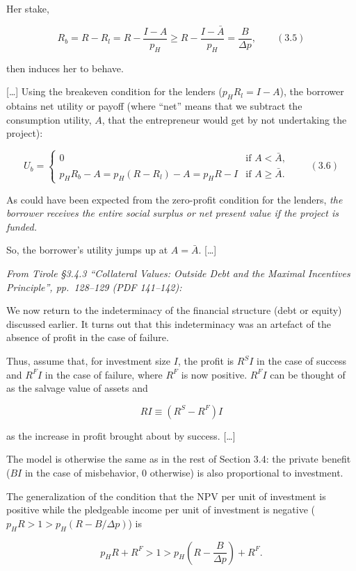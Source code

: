 \documentclass[11pt,a4paper]{article}
\begin{document}
Her stake,

\[R_b = R - R_l = R - \frac{I - A}{p_H} \geqslant R - \frac{I - \bar A}{p_H} = \frac{B}{\Delta p}, \qquad (3.5)\]

then induces her to behave.

{[}\ldots{]} Using the breakeven condition for the lenders (\(p_H R_l = I - A\)), the borrower
obtains net utility or payoff (where ``net'' means that we subtract the consumption utility, \(A\),
that the entrepreneur would get by not undertaking the project):

\[U_b = \begin{cases} 0 & \text{if } A < \bar A, \\ p_H R_b - A = p_H(R - R_l) - A = p_H R - I & \text{if } A \geqslant \bar A. \end{cases} \qquad (3.6)\]

As could have been expected from the zero-profit condition for the lenders, \emph{the borrower
receives the entire social surplus or net present value if the project is funded.}

So, the borrower's utility jumps up at \(A = \bar A\). {[}\ldots{]}

\emph{From Tirole §3.4.3 ``Collateral Values: Outside Debt and the Maximal Incentives Principle'',
pp.~128--129 (PDF 141--142):}

We now return to the indeterminacy of the financial structure (debt or equity) discussed earlier. It
turns out that this indeterminacy was an artefact of the absence of profit in the case of failure.

Thus, assume that, for investment size \(I\), the profit is \(R^S I\) in the case of success and
\(R^F I\) in the case of failure, where \(R^F\) is now positive. \(R^F I\) can be thought of as the
salvage value of assets and

\[RI \equiv (R^S - R^F) I\]

as the increase in profit brought about by success. {[}\ldots{]}

The model is otherwise the same as in the rest of Section 3.4: the private benefit (\(BI\) in the
case of misbehavior, 0 otherwise) is also proportional to investment.

The generalization of the condition that the NPV per unit of investment is positive while the
pledgeable income per unit of investment is negative (\(p_H R > 1 > p_H(R - B/\Delta p)\)) is

\[p_H R + R^F > 1 > p_H\left(R - \frac{B}{\Delta p}\right) + R^F.\]
\end{document}
